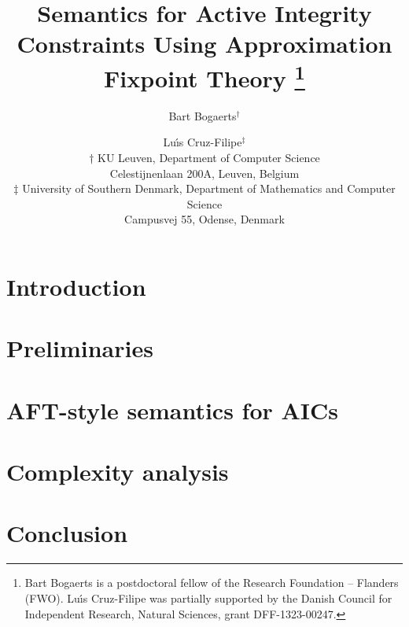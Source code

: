 \documentclass{article}
\title{Semantics for Active Integrity Constraints Using Approximation Fixpoint Theory%
\thanks{Bart Bogaerts is a postdoctoral fellow of the Research Foundation -- Flanders (FWO).
Lu\'\i s Cruz-Filipe was partially supported by the Danish Council for Independent Research, Natural Sciences, grant DFF-1323-00247.}
}
\author{
Bart Bogaerts$^\dagger$ \and Lu\'\i s Cruz-Filipe$^\ddagger$  \\
$\dagger$ KU Leuven, Department of Computer Science\\ Celestijnenlaan 200A, Leuven, Belgium \\
$\ddagger$ University of Southern Denmark, Department of Mathematics and Computer Science\\
Campusvej 55, Odense, Denmark}
\begin{document}
\maketitle




\section{Introduction}


\section{Preliminaries}


\section{AFT-style semantics for AICs}




\section{Complexity analysis}



\section{Conclusion}


\newpage \small



\end{document}
